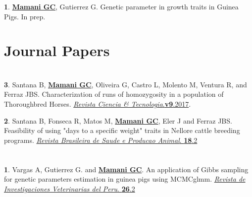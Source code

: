 \documentclass[margin,line,10pt]{res}
\newenvironment{list1}{
  \begin{list}{\ding{113}}{%
      \setlength{\itemsep}{0in}
      \setlength{\parsep}{0in} \setlength{\parskip}{0in}
      \setlength{\topsep}{0in} \setlength{\partopsep}{0in} 
      \setlength{\leftmargin}{0.17in}}}{\end{list}}
\begin{document}
\begin{resume}
\begin{list1}
\item [{\bf 1}.]  {\bf \underline{Mamani GC}}, Gutierrez G.   
     Genetic parameter in growth traits in Guinea Pigs. In prep. %

\end{list1}
\vspace{0.5cm}

\vspace{0.5cm}
\section{\sc Journal Papers}

\vspace{0.9cm}

\section{}

\begin{list1}
\item [{\bf 3}.]  Santana B, {\bf \underline{Mamani GC}}, Oliveira G, Castro L, Molento M, Ventura R, and Ferraz JBS. Characterization of runs of homozygosity in a population of Thoroughbred Horses.   
     \textcolor{black}{\href{http://www.citec.fatecjab.edu.br/index.php/files/article/view/1161}{{\it Revista Ciencia & Tecnologia}.{\bf v9}.2017}. } 
     \vspace{0.5cm}
     \item [{\bf 2}.] Santana B, Fonseca R, Matos M, {\bf \underline{Mamani GC}}, Eler J and Ferraz JBS.  
     Feasibility of using "days to a specific weight" traits in Nellore cattle breeding programs.   
     \textcolor{black}{\href{http://www.scielo.br/scielo.php?script=sci_arttext&pid=S1519-99402017000200260}{{\it Revista Brasileira de Saude e Producao Animal}. {\bf 18}.2}}
\end{list1}
\vspace{0.5cm}

\section{}

\begin{list1}
\item [{\bf 1}.]  Vargas A, Gutierrez G. and {\bf \underline{Mamani GC}}.  
 An application of Gibbs sampling for genetic parameters estimation in guinea pigs using MCMCglmm.   
     \textcolor{black}{\href{http://dev.scielo.org.pe/scielo.php?script=sci_arttext&pid=S1609-91172015000200003&lng=en&nrm=iso}{{\it Revista de Investigaciones Veterinarias del Peru}. {\bf 26}.2 } } 
\end{list1}
\vspace{0.5cm}


\end{resume}
\end{document}

